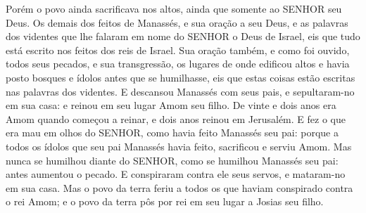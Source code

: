 {Porém o povo ainda sacrificava nos altos, ainda que somente ao SENHOR seu Deus.
Os demais dos feitos de Manassés, e sua oração a seu Deus, e as palavras dos videntes que lhe falaram em nome do SENHOR o Deus de Israel, eis que tudo está escrito nos feitos dos reis de Israel.
Sua oração também, e como foi ouvido, todos seus pecados, e sua transgressão, os lugares de onde edificou altos e havia posto bosques e ídolos antes que se humilhasse, eis que estas coisas estão escritas nas palavras dos videntes.
E descansou Manassés com seus pais, e sepultaram-no em sua casa: e reinou em seu lugar Amom seu filho.
De vinte e dois anos era Amom quando começou a reinar, e dois anos reinou em Jerusalém.
E fez o que era mau em olhos do SENHOR, como havia feito Manassés seu pai: porque a todos os ídolos que seu pai Manassés havia feito, sacrificou e serviu Amom.
Mas nunca se humilhou diante do SENHOR, como se humilhou Manassés seu pai: antes aumentou o pecado.
E conspiraram contra ele seus servos, e mataram-no em sua casa.
Mas o povo da terra feriu a todos os que haviam conspirado contra o rei Amom; e o povo da terra pôs por rei em seu lugar a Josias seu filho.

}
